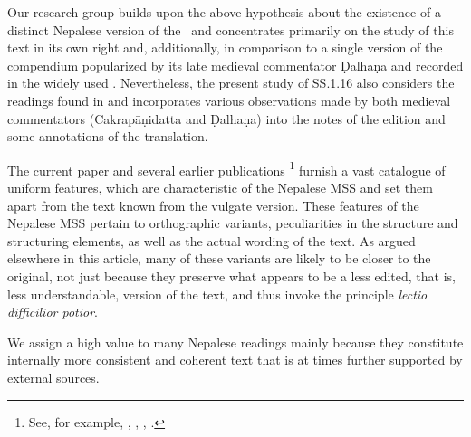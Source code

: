 Our research group builds upon the above hypothesis about the existence of a 
distinct Nepalese version of the \SS\ and concentrates primarily on the study of 
this text in its own right and, additionally, in comparison to a single version of the 
compendium popularized by its late medieval commentator Ḍalhaṇa and 
recorded in the widely used \cite{vulgate}. Nevertheless, the present study of 
SS.1.16 also considers the readings found in \cite{acar-1939} and incorporates 
various observations made by both medieval commentators (Cakrapāṇidatta and 
Ḍalhaṇa) into the notes of the edition and some annotations of the translation.

The current paper and several earlier publications%
    \footnote{%
    See, for example, \citet{hari-2011}, \citet{wuja-2013}, \citet{birc-2021}, \citet{birc-2021a}.%
    } 
furnish a vast catalogue of uniform features, which are characteristic of the Nepalese MSS and set them apart from the text known from the vulgate version. These features of the Nepalese MSS pertain to orthographic variants, peculiarities in the structure and structuring elements, as well as the actual wording of the text. As argued elsewhere in this article, many of these variants are likely to be closer to the original, not just because they preserve what appears to be a less edited, that is, less understandable, version of the text, and thus invoke the principle \emph{lectio difficilior potior}.

We assign a high value to many Nepalese readings mainly because they constitute internally more consistent and coherent text that is at times further supported by external sources.

